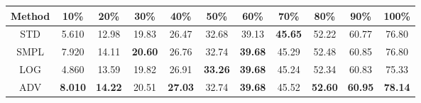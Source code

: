 \documentclass{standalone}
\begin{document}
\begin{tabular}{c|cccccccccc}
      \toprule
      Method & 10\% & 20\% & 30\% & 40\% & 50\% & 60\% & 70\% & 80\% & 90\% & 100\% \\
      \midrule
STD & 5.610 & 12.98 & 19.83 & 26.47 & 32.68 & 39.13 & \textbf{45.65} & 52.22 & 60.77 & 76.80\\
SMPL & 7.920 & 14.11 & \textbf{20.60} & 26.76 & 32.74 & \textbf{39.68} & 45.29 & 52.48 & 60.85 & 76.80\\
LOG & 4.860 & 13.59 & 19.82 & 26.91 & \textbf{33.26} & \textbf{39.68} & 45.24 & 52.34 & 60.83 & 75.33\\
ADV & \textbf{8.010} & \textbf{14.22} & 20.51 & \textbf{27.03} & 32.74 & \textbf{39.68} & 45.52 & \textbf{52.60} & \textbf{60.95} & \textbf{78.14}\\
  \bottomrule
\end{tabular}
\end{document}
